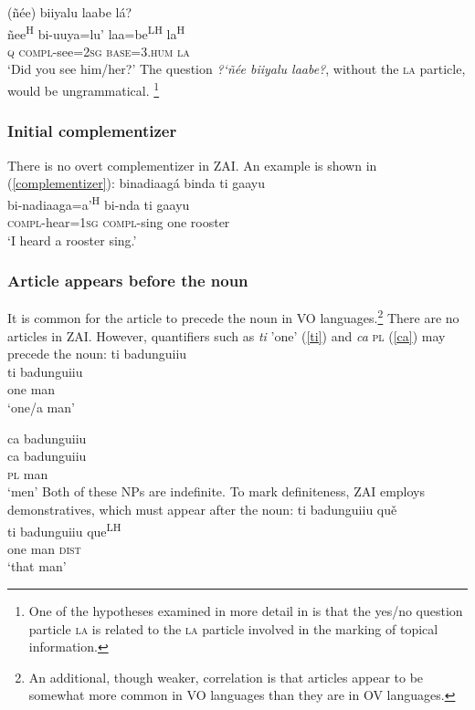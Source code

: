 \ea
{}(ñ\'{e}e) biiyalu laabe l\'{a}? \\
ñee\textsuperscript{H} bi-uuya=lu' laa=be\textsuperscript{LH} la\textsuperscript{H} \\
\textsc{q} \textsc{compl}-see=\textsc{2sg} \textsc{base}=\textsc{3.hum} \textsc{la} \\
\glt `Did you see him/her?'
\z
The question \textit{{?`}ñ\'{e}e biiyalu laabe?}, without the \textsc{la} particle, would be ungrammatical. \footnote{One of the hypotheses examined in more detail in  is that the yes/no question particle \textsc{la} is related to the \textsc{la} particle involved in the marking of topical information.}


\subsubsection{Initial complementizer}

There is no overt complementizer in ZAI. An example is shown in (\ref{complementizer}):
\ea\label{complementizer}
\glll binadiaag\'{a} binda ti gaayu \\
bi-nadiaaga=a'\textsuperscript{H} bi-nda ti gaayu \\
\textsc{compl}-hear=\textsc{1sg} \textsc{compl}-sing one rooster \\
\glt `I heard a rooster sing.'
\z


\subsubsection{Article appears before the noun}

It is common for the article to precede the noun in VO languages.\footnote{An additional, though weaker, correlation is that articles appear to be somewhat more common in VO languages than they are in OV languages.} There are no articles in ZAI. However, quantifiers such as \textit{ti} 'one' (\ref{ti}) and \textit{ca} \textsc{pl} (\ref{ca}) may precede the noun:
\ea\label{ti}
\glll ti badunguiiu \\
ti badunguiiu \\
one man \\
\glt `one/a man'

\z

\ea\label{ca}
\glll ca badunguiiu \\
ca badunguiiu \\
\textsc{pl} man \\
\glt `men'
\z
Both of these NPs are indefinite. To mark definiteness, ZAI employs demonstratives, which must appear after the noun:
\ea\label{ti2}
\glll ti badunguiiu qu\v{e} \\
ti badunguiiu que\textsuperscript{LH} \\
one man \textsc{dist} \\
\glt `that man'
\z

